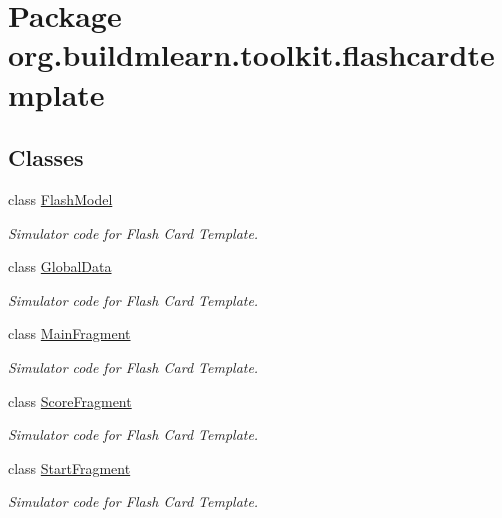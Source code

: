 \hypertarget{namespaceorg_1_1buildmlearn_1_1toolkit_1_1flashcardtemplate}{\section{Package org.\-buildmlearn.\-toolkit.\-flashcardtemplate}
\label{namespaceorg_1_1buildmlearn_1_1toolkit_1_1flashcardtemplate}
}
\subsection*{Classes}
\begin{DoxyCompactItemize}
\item 
class \hyperlink{classorg_1_1buildmlearn_1_1toolkit_1_1flashcardtemplate_1_1FlashModel}{Flash\-Model}
\begin{DoxyCompactList}\small\item\em Simulator code for Flash Card Template. \end{DoxyCompactList}\item 
class \hyperlink{classorg_1_1buildmlearn_1_1toolkit_1_1flashcardtemplate_1_1GlobalData}{Global\-Data}
\begin{DoxyCompactList}\small\item\em Simulator code for Flash Card Template. \end{DoxyCompactList}\item 
class \hyperlink{classorg_1_1buildmlearn_1_1toolkit_1_1flashcardtemplate_1_1MainFragment}{Main\-Fragment}
\begin{DoxyCompactList}\small\item\em Simulator code for Flash Card Template. \end{DoxyCompactList}\item 
class \hyperlink{classorg_1_1buildmlearn_1_1toolkit_1_1flashcardtemplate_1_1ScoreFragment}{Score\-Fragment}
\begin{DoxyCompactList}\small\item\em Simulator code for Flash Card Template. \end{DoxyCompactList}\item 
class \hyperlink{classorg_1_1buildmlearn_1_1toolkit_1_1flashcardtemplate_1_1StartFragment}{Start\-Fragment}
\begin{DoxyCompactList}\small\item\em Simulator code for Flash Card Template. \end{DoxyCompactList}\end{DoxyCompactItemize}
